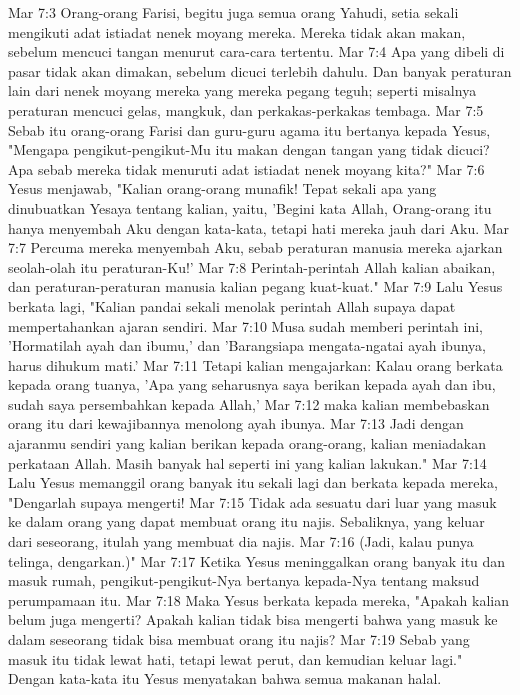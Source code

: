 Mar 7:3  Orang-orang Farisi, begitu juga semua orang Yahudi, setia sekali mengikuti adat istiadat nenek moyang mereka. Mereka tidak akan makan, sebelum mencuci tangan menurut cara-cara tertentu.
Mar 7:4  Apa yang dibeli di pasar tidak akan dimakan, sebelum dicuci terlebih dahulu. Dan banyak peraturan lain dari nenek moyang mereka yang mereka pegang teguh; seperti misalnya peraturan mencuci gelas, mangkuk, dan perkakas-perkakas tembaga.
Mar 7:5  Sebab itu orang-orang Farisi dan guru-guru agama itu bertanya kepada Yesus, "Mengapa pengikut-pengikut-Mu itu makan dengan tangan yang tidak dicuci? Apa sebab mereka tidak menuruti adat istiadat nenek moyang kita?"
Mar 7:6  Yesus menjawab, "Kalian orang-orang munafik! Tepat sekali apa yang dinubuatkan Yesaya tentang kalian, yaitu, 'Begini kata Allah, Orang-orang itu hanya menyembah Aku dengan kata-kata, tetapi hati mereka jauh dari Aku.
Mar 7:7  Percuma mereka menyembah Aku, sebab peraturan manusia mereka ajarkan seolah-olah itu peraturan-Ku!'
Mar 7:8  Perintah-perintah Allah kalian abaikan, dan peraturan-peraturan manusia kalian pegang kuat-kuat."
Mar 7:9  Lalu Yesus berkata lagi, "Kalian pandai sekali menolak perintah Allah supaya dapat mempertahankan ajaran sendiri.
Mar 7:10  Musa sudah memberi perintah ini, 'Hormatilah ayah dan ibumu,' dan 'Barangsiapa mengata-ngatai ayah ibunya, harus dihukum mati.'
Mar 7:11  Tetapi kalian mengajarkan: Kalau orang berkata kepada orang tuanya, 'Apa yang seharusnya saya berikan kepada ayah dan ibu, sudah saya persembahkan kepada Allah,'
Mar 7:12  maka kalian membebaskan orang itu dari kewajibannya menolong ayah ibunya.
Mar 7:13  Jadi dengan ajaranmu sendiri yang kalian berikan kepada orang-orang, kalian meniadakan perkataan Allah. Masih banyak hal seperti ini yang kalian lakukan."
Mar 7:14  Lalu Yesus memanggil orang banyak itu sekali lagi dan berkata kepada mereka, "Dengarlah supaya mengerti!
Mar 7:15  Tidak ada sesuatu dari luar yang masuk ke dalam orang yang dapat membuat orang itu najis. Sebaliknya, yang keluar dari seseorang, itulah yang membuat dia najis.
Mar 7:16  (Jadi, kalau punya telinga, dengarkan.)"
Mar 7:17  Ketika Yesus meninggalkan orang banyak itu dan masuk rumah, pengikut-pengikut-Nya bertanya kepada-Nya tentang maksud perumpamaan itu.
Mar 7:18  Maka Yesus berkata kepada mereka, "Apakah kalian belum juga mengerti? Apakah kalian tidak bisa mengerti bahwa yang masuk ke dalam seseorang tidak bisa membuat orang itu najis?
Mar 7:19  Sebab yang masuk itu tidak lewat hati, tetapi lewat perut, dan kemudian keluar lagi." Dengan kata-kata itu Yesus menyatakan bahwa semua makanan halal.
